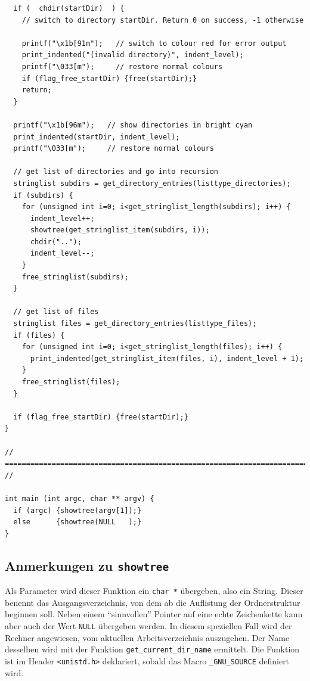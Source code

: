 \begin{codebox}[]
\begin{verbatim}
  if (  chdir(startDir)  ) {
    // switch to directory startDir. Return 0 on success, -1 otherwise
    
    printf("\x1b[91m");   // switch to colour red for error output
    print_indented("(invalid directory)", indent_level);
    printf("\033[m");     // restore normal colours
    if (flag_free_startDir) {free(startDir);}
    return;
  }
  
  printf("\x1b[96m");   // show directories in bright cyan
  print_indented(startDir, indent_level);
  printf("\033[m");     // restore normal colours
  
  // get list of directories and go into recursion
  stringlist subdirs = get_directory_entries(listtype_directories);
  if (subdirs) {
    for (unsigned int i=0; i<get_stringlist_length(subdirs); i++) {
      indent_level++;
      showtree(get_stringlist_item(subdirs, i));
      chdir("..");
      indent_level--;
    }
    free_stringlist(subdirs);
  }
  
  // get list of files
  stringlist files = get_directory_entries(listtype_files);
  if (files) {
    for (unsigned int i=0; i<get_stringlist_length(files); i++) {
      print_indented(get_stringlist_item(files, i), indent_level + 1);
    }
    free_stringlist(files);
  }
  
  if (flag_free_startDir) {free(startDir);}
}

// ========================================================================= //

int main (int argc, char ** argv) {
  if (argc) {showtree(argv[1]);}
  else      {showtree(NULL   );}
}
\end{verbatim}
\end{codebox}

\subsection{Anmerkungen zu \texttt{showtree}}
Als Parameter wird dieser Funktion ein \texttt{char *} übergeben, also ein String. Dieser benennt das Ausgangsverzeichnis, von dem ab die Auflistung der Ordnerstruktur beginnen soll. Neben einem \enquote{sinnvollen} Pointer auf eine echte Zeichenkette kann aber auch der Wert \texttt{NULL} übergeben werden. In diesem speziellen Fall wird der Rechner angewiesen, vom aktuellen Arbeitsverzeichnis auszugehen. Der Name desselben wird mit der Funktion \texttt{get\_current\_dir\_name} ermittelt. Die Funktion ist im Header \texttt{<unistd.h>} deklariert, sobald das Macro \texttt{\_GNU\_SOURCE} definiert wird.

